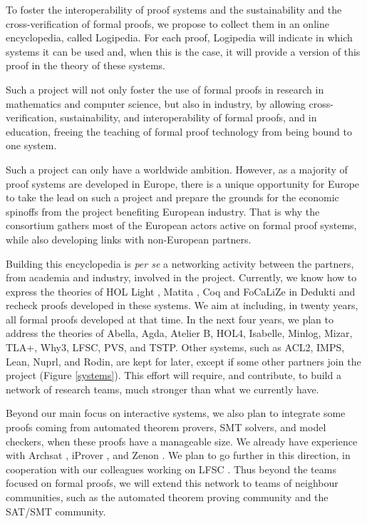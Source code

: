To foster the interoperability of proof systems and the sustainability
and the cross-verification of formal proofs, we propose to collect
them in an online encyclopedia, called {\sf Logipedia}.  For each
proof, {\sf Logipedia} will indicate in which systems it can be used
and, when this is the case, it will provide a version of this proof in
the theory of these systems.

Such a project will not only foster the use of formal proofs in
research in mathematics and computer science, but also in industry, by
allowing cross-verification, sustainability, and interoperability of
formal proofs, and in education, freeing the teaching of formal proof
technology from being bound to one system.

Such a project can only have a worldwide ambition. However, as a
majority of proof systems are developed in Europe, there is a unique
opportunity for Europe to take the lead on such a project and prepare
the grounds for the economic spinoffs from the project benefiting
European industry. That is why the consortium gathers most of the
European actors active on formal proof systems, while also developing
links with non-European partners.

Building this encyclopedia is {\em per se} a networking activity
between the partners, from academia and industry, involved in the
project.  Currently, we know how to express the theories of {\sf HOL
  Light} \cite{Assaf12}, {\sf Matita} \cite{Assaf15}, {\sf Coq} and
{\sf FoCaLiZe} \cite{Cauderlier16} in {\sf Dedukti} and recheck proofs
developed in these systems.  We aim at including, in twenty years, all
formal proofs developed at that time.
In the next four years, we plan to address the theories of {\sf
  Abella}, {\sf Agda}, {\sf Atelier B}, {\sf HOL4}, {\sf Isabelle},
{\sf Minlog}, {\sf Mizar}, {\sf TLA+}, {\sf Why3}, {\sf
  LFSC}, {\sf PVS}, and {\sf TSTP}.  Other systems, such as {\sf
  ACL2}, {\sf IMPS}, {\sf Lean}, {\sf Nuprl}, and {\sf Rodin}, are
kept for later, except if some other partners join the project (Figure
\ref{systems}). This effort will require, and contribute, to build a
network of research teams, much stronger than what we currently have.

Beyond our main focus on interactive systems, we also plan to
integrate some proofs coming from automated theorem provers, SMT
solvers, and model checkers, when these proofs have a manageable
size. We already have experience with Archsat \cite{Bury19}, iProver
\cite{Burel10}, and Zenon \cite{CauderlierHalmagrand15}. We plan to go
further in this direction, in cooperation with our colleagues working
on LFSC \cite{Stump09}. Thus beyond the teams focused on formal proofs, we
will extend this network to teams of neighbour communities, such as
the automated theorem proving community and the SAT/SMT community.

